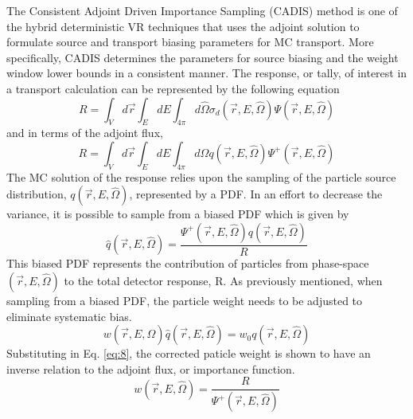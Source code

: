 The Consistent Adjoint Driven Importance Sampling (CADIS) method is one of the
hybrid deterministic  VR
techniques that uses the adjoint solution to 
formulate source and transport biasing parameters for MC transport.
More specifically, CADIS determines the parameters for source biasing and the
weight window lower bounds in a consistent manner.
The response, or tally, of interest in a transport calculation can be represented by
the following equation
\begin{equation} \label{eq:6}
	R = \int_{V}d\overrightarrow{r} \int_{E} dE
	\int_{4\pi} d\widehat{\Omega}
	\sigma_{d}(\overrightarrow{r}, E, \widehat{\Omega})
	\Psi(\overrightarrow{r}, E, \widehat{\Omega})
\end{equation}
and in terms of the adjoint flux, 
\begin{equation} \label{eq:7}
	R = \int_{V}d\overrightarrow{r} \int_{E} dE
	\int_{4\pi} d\widehat{\Omega}
	q(\overrightarrow{r}, E, \widehat{\Omega})
	\Psi^{+}(\overrightarrow{r}, E, \widehat{\Omega})
\end{equation}
The MC solution of the response relies upon the sampling of the particle source
distribution, $q(\overrightarrow{r}, E, \widehat{\Omega})$, represented by a PDF.
In an effort to decrease the variance, it is possible to sample from a biased
PDF which is given by
\begin{equation} \label{eq:8}
	\widehat{q}(\overrightarrow{r}, E, \widehat{\Omega}) =
	\frac{\Psi^{+}(\overrightarrow{r}, E,\widehat{\Omega})
	q(\overrightarrow{r}, E, \widehat{\Omega})}{R}
\end{equation}
This biased PDF represents the contribution of particles from phase-space
$(\overrightarrow{r}, E, \widehat{\Omega})$ to the total detector response, R.
As previously mentioned, when sampling from a biased PDF, the particle weight
needs to be adjusted to eliminate systematic bias.  
\begin{equation} \label{eq:9}
	w(\overrightarrow{r}, E,
	\widehat{\Omega})\widehat{q}(\overrightarrow{r}, E, \widehat{\Omega})=
	w_{0}q(\overrightarrow{r}, E, \widehat{\Omega})
\end{equation}
Substituting in Eq. \ref{eq:8}, the corrected paticle weight is shown to have
an inverse relation to the adjoint flux, or importance function.
\begin{equation} \label{eq:10}
	w(\overrightarrow{r}, E, \widehat{\Omega})=
	\frac{R}{\Psi^{+}(\overrightarrow{r}, E, \widehat{\Omega})}
\end{equation}
